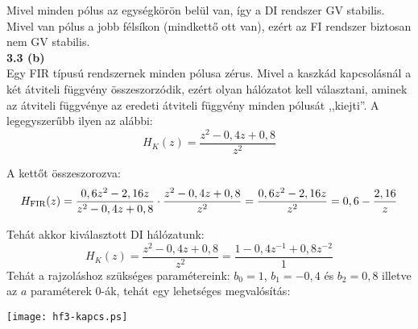 \documentclass[12pt,a4paper]{article}
\begin{document}
Mivel minden pólus az egységkörön belül van, így a DI rendszer GV stabilis. Mivel van pólus a jobb félsíkon (mindkettő ott van), ezért az FI rendszer biztosan nem GV stabilis.\\

\textbf{3.3 (b)}\\

Egy FIR típusú rendszernek minden pólusa zérus. Mivel a kaszkád kapcsolásnál a két átviteli függvény összeszorzódik, ezért olyan hálózatot kell választani, aminek az átviteli függvénye az eredeti átviteli függvény minden pólusát ,,kiejti''. A legegyszerűbb ilyen az alábbi:
\[\boxed{H_K(z) = \frac{z^2-0,4 z+0,8}{z^2}}\]

A kettőt összeszorozva:
\[H_{\hbox{\scriptsize FIR}}(z) = \frac{0,6 z^2-2,16z}{z^2-0,4 z+0,8}\cdot\frac{z^2-0,4 z+0,8}{z^2} = \frac{0,6 z^2-2,16z}{z^2} = 0,6-\frac{2,16}{z}\]

Tehát akkor kiválasztott DI hálózatunk:
\[H_K(z) = \frac{z^2-0,4 z+0,8}{z^2} = \frac{1-0,4 z^{-1}+0,8z^{-2}}{1}\]
Tehát a rajzoláshoz szükséges paramétereink: $b_0 = 1$, $b_1 = -0,4$ és $b_2 = 0,8$ illetve az $a$ paraméterek 0-ák, tehát egy lehetséges megvalósítás:

\begin{center}
\texttt{[image: hf3-kapcs.ps]}
\end{center}
\end{document}
